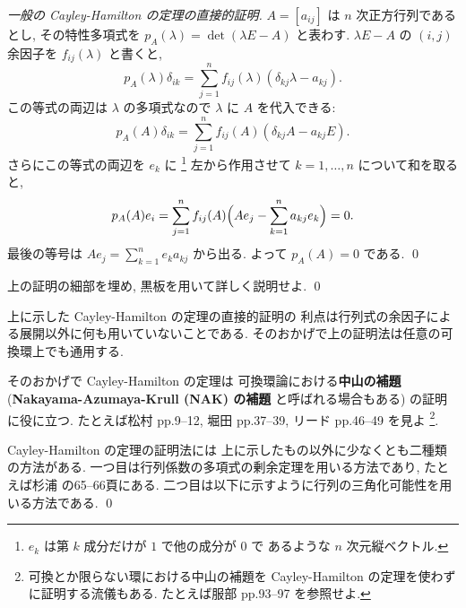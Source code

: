 \documentclass[12pt,twoside]{jarticle}
\begin{document}
\begin{proof}[一般の Cayley-Hamilton の定理の直接的証明]
  $A=[a_{ij}]$ は $n$ 次正方行列であるとし, 
  その特性多項式を $p_A(\lambda)=\det(\lambda E - A)$ と表わす.
  $\lambda E - A$ の $(i,j)$ 余因子を $f_{ij}(\lambda)$ と書くと,
  \begin{equation*}
    p_A(\lambda)\delta_{ik}
    = \sum_{j=1}^n f_{ij}(\lambda) (\delta_{kj}\lambda - a_{kj}).
  \end{equation*}
  この等式の両辺は $\lambda$ の多項式なので $\lambda$ に $A$ を代入できる:
  \begin{equation*}
    p_A(A)\delta_{ik} = \sum_{j=1}^n f_{ij}(A)(\delta_{kj}A - a_{kj}E).
  \end{equation*}
  さらにこの等式の両辺を $e_k$ に%
  \footnote{$e_k$ は第 $k$ 成分だけが $1$ で他の成分が $0$ で
    あるような $n$ 次元縦ベクトル.}%
  左から作用させて $k=1,\dots,n$ について和を取ると, 
  \begin{equation*}
    p_A(A)e_i
    = \sum_{j=1}^n f_{ij}(A)\Bigl( A e_j - \sum_{k=1}^n a_{kj} e_k \Bigr)
    = 0.
  \end{equation*}
  最後の等号は $Ae_j=\sum_{k=1}^n e_k a_{kj}$ から出る. 
  よって $p_A(A)=0$ である.
  \qed
\end{proof}

\begin{question}
  上の証明の細部を埋め, 黒板を用いて詳しく説明せよ. \qed
\end{question}


\begin{guide}
  上に示した Cayley-Hamilton の定理の直接的証明の
  利点は行列式の余因子による展開以外に何も用いていないことである.  
  そのおかげで上の証明法は任意の可換環上でも通用する.

  そのおかげで Cayley-Hamilton の定理は
  可換環論における{\bf 中山の補題} ({\bf Nakayama-Azumaya-Krull (NAK) の補題}
  と呼ばれる場合もある) の証明に役に立つ.
  たとえば松村 \cite{M1} pp.9--12, 堀田 \cite{Ho} pp.37--39, 
  リード \cite{Reid} pp.46--49 を見よ%
  \footnote{可換とか限らない環における中山の補題を 
    Cayley-Hamilton の定理を使わずに証明する流儀もある.
    たとえば服部 \cite{Hattori} pp.93--97 を参照せよ.}.

  Cayley-Hamilton の定理の証明法には
  上に示したもの以外に少なくとも二種類の方法がある. 
  一つ目は行列係数の多項式の剰余定理を用いる方法であり, 
  たとえば杉浦 \cite{sugiura} の65--66頁にある.
  二つ目は以下に示すように行列の三角化可能性を用いる方法である. 
  \qed
\end{guide}
\end{document}
